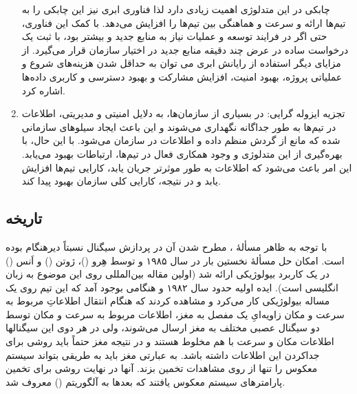 \begin{enumerate}
چابکی در این متدلوژی اهمیت زیادی دارد لذا فناوری ابری نیز این چابکی را به تیم‌ها ارائه و سرعت و هماهنگی بین تیم‌ها را افزایش می‌دهد. با کمک این فناوری، حتی اگر در فرایند توسعه و عملیات نیاز به منابع جدید و بیشتر بود، با ثبت یک درخواست ساده در عرض چند دقیقه منابع جدید در اختیار سازمان قرار می‌گیرد. از مزایای دیگر استفاده از رایانش ابری می توان به حداقل شدن هزینه‌های شروع و عملیاتی پروژه، بهبود امنیت، افزایش مشارکت و بهبود دسترسی و کاربری داده‌ها اشاره کرد.
	\item
تجزیه ایزوله گرایی: در بسیاری از سازمان‌ها، به دلایل امنیتی و مدیریتی، اطلاعات در تیم‌ها به طور جداگانه نگهداری می‌شوند و این باعث ایجاد سیلوهای سازمانی شده که مانع از گردش منظم داده و اطلاعات در سازمان می‌شود.
با این حال، با بهره‌گیری از این متدلوژی و وجود همکاری فعال در تیم‌ها، ارتباطات بهبود می‌یابد. این امر باعث می‌شود که اطلاعات به طور موثرتر جریان یابد، کارایی تیم‌ها افزایش یابد و در نتیجه، کارایی کلی سازمان بهبود پیدا کند.
\end{enumerate}




\subsection{تاریخه }
با توجه به ظاهر   مسألهٔ ، مطرح شدن آن در پردازش سیگنال نسبتاً
دیرهنگام بوده است. امکان حل مسألهٔ  نخستین بار در سال  ۱۹۸۵ و توسط
هِرو ()، ژوتن () و اَنس () در یک کاربرد بیولوژیکی ارائه شد 
 (اولین مقاله بین‌المللی روی این موضوع به زبان انگلیسی
 است). ایده اولیه حدود سال ۱۹۸۲ و هنگامی بوجود آمد
که این تیم روی یک مساله بیولوژیکی کار می‌کرد و مشاهده کردند که هنگام
انتقال اطلاعاتِ مربوط به سرعت و مکان زاویه‌ایِ یک مفصل به مغز، اطلاعات
مربوط به سرعت و مکان توسط دو سیگنال عصبی مختلف به مغز ارسال
می‌شوند، ولی در هر دوی این سیگنالها اطلاعات مکان و سرعت با هم مخلوط
هستند و در نتیجه مغز حتماً باید روشی برای جداکردن این اطلاعات داشته باشد.
به عبارتی مغز باید به طریقی بتواند سیستم معکوس را تنها از روی مشاهدات
تخمین بزند. آنها در نهایت روشی برای تخمین پارامترهای سیستم معکوس یافتند
که بعدها به آلگوریتم  () معروف شد.

